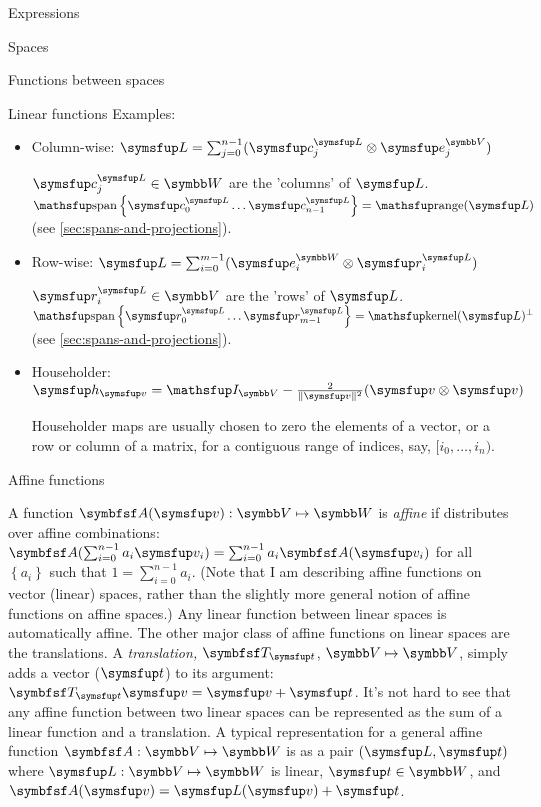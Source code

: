\documentclass{PalisadesLakesArticle}
\begin{document}
\begin{plSection}{Expressions}
\begin{plSection}{Spaces}
\begin{plSection}{Functions between spaces}
\begin{plSection}{Linear functions}
Examples:

\begin{itemize}

\item Column-wise:
$\Vector{L} = \sum_{j=0}^{n-1} 
( \Vector{c}_j^{\Vector{L}} \otimes \Vector{e}_j^{\Space{V}} )$

$\Vector{c}_j^{\Vector{L}} \in \Space{W}$ 
are the 'columns' of $\Vector{L}$.
$\linearspan\left\{ \Vector{c}_0^{\Vector{L}} 
\ldots \Vector{c}_{n-1}^{\Vector{L}} \right\} = \range(\Vector{L})$
(see \cref{sec:spans-and-projections}).

\item Row-wise:
$\Vector{L} = \sum_{i=0}^{m-1} ( \Vector{e}_i^{\Space{W}} \otimes  \Vector{r}_i^{\Vector{L}} )$

$\Vector{r}_i^{\Vector{L}} \in \Space{V}$ are the 'rows' of $\Vector{L}$.
$\linearspan\left\{ \Vector{r}_0^{\Vector{L}} \ldots \Vector{r}_{m-1}^{\Vector{L}} \right\} =  \kernel(\Vector{L})^{\perp}$
(see \cref{sec:spans-and-projections}).

\item Householder:
$\Vector{h}_{\Vector{v}} 
= \Identity_{\Space{V}} - \frac{2}{\| \Vector{v} \|^2} 
(\Vector{v} \otimes \Vector{v})$

Householder maps are usually chosen to zero the elements of
a vector, or a row or column of a matrix, for a contiguous range of
indices, say, $[i_0,\ldots,i_n)$.

\end {itemize}

\end{plSection}%
\begin{plSection}{Affine functions}
\label{sec:affine-functions}

A function $\Point{A}(\Vector{v}):\Space{V} \mapsto \Space{W}$
is \textit{affine} if distributes over affine combinations:
$\Point{A}(\sum_{i=0}^{n-1} 
a_i \Vector{v}_i) = \sum_{i=0}^{n-1} a_i \Point{A}(\Vector{v}_i) $
for all $\left\{a_i\right\}$ such that $1 = \sum_{i=0}^{n-1} a_i$.
(Note that I am describing affine functions on vector (linear) spaces,
rather than the slightly more general notion of affine functions on affine spaces.)
Any linear function between linear spaces is automatically affine.
The other major class of affine functions on linear spaces are the translations.
A \textit{translation,} $\Point{T}_{\Vector{t}}$, $\Space{V} \mapsto \Space{V}$,
simply adds a vector ($\Vector{t}$) to its argument:
$\Point{T}_{\Vector{t}} \Vector{v} = \Vector{v} + \Vector{t}$.
It's not hard to see that any affine function between two linear spaces
can be represented as the sum of a linear function and a translation.
A typical representation for a general affine function 
$\Point{A} : \Space{V} \mapsto \Space{W}$
is as a pair $(\Vector{L},\Vector{t})$ where $
\Vector{L} : \Space{V} \mapsto \Space{W}$ is linear,
$\Vector{t} \in \Space{W}$, and 
$\Point{A}(\Vector{v}) = \Vector{L}(\Vector{v}) + \Vector{t}$.


\end{plSection}
\end{plSection}
\end{plSection}
\end{plSection}
\end{document}
